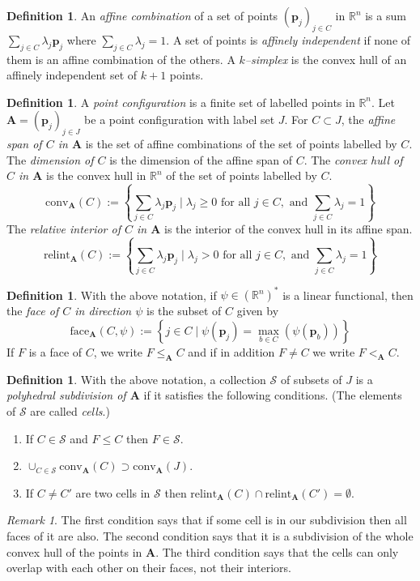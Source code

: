 \documentclass[12pt]{amsart}
\theoremstyle{definition}
\newtheorem{defn}[thm]{Definition}
\theoremstyle{remark}
\newtheorem{rmk}[thm]{Remark}
\def\R{\mathbb{R}}
\def \bA{\mathbf{A}} %
\def \bp{\mathbf{p}}
\begin{document}
\begin{defn}
An \emph{affine combination} of a set of points $(\bp_j)_{j\in C}$ in $\R^n$ is a sum $\sum_{j\in C} \lambda_j \bp_j$ where $ \sum_{j\in C} \lambda_j =1.$ A set of points is \emph{affinely independent} if none of them is an affine combination of the others. A \emph{$k$--simplex} is the convex hull of an affinely independent set of $k+1$ points.
\end{defn}
\begin{defn}
A \emph{point configuration} is a finite set of labelled points in $\R^n$. Let $\bA = (\bp_j)_{j\in J}$ be a point configuration with label set $J$. For $C\subset J$, the \emph{affine span of $C$ in $\bA$} is the set of affine combinations of the set of points labelled by $C$. The \emph{dimension of $C$} is the dimension of the affine span of $C$. The \emph{convex hull of $C$ in $\bA$} is the convex hull in $\R^n$ of the set of points labelled by $C$. 
\[ 
\text{conv}_\bA(C):=\left\{ \sum_{j\in C} \lambda_j \bp_j \mid \lambda_j\geq0 \text{ for all } j \in C, \text{ and } \sum_{j\in C} \lambda_j =1\right\}
\]
The \emph{relative interior of $C$ in $\bA$} is the interior of the convex hull in its affine span. 
\[ 
\text{relint}_\bA(C):=\left\{ \sum_{j\in C} \lambda_j \bp_j \mid \lambda_j >0 \text{ for all } j \in C, \text{ and } \sum_{j\in C} \lambda_j =1\right\}
\]
\end{defn}
\begin{defn}
With the above notation, if $\psi\in(\R^n)^*$ is a linear functional, then the \emph{face of $C$ in direction $\psi$} is the subset of $C$ given by
\[ 
\text{face}_\bA(C, \psi):=\left\{ j\in C \mid \psi(\bp_j)=\max_{b\in C}(\psi(\bp_b)) \right\}
\]
If $F$ is a face of $C$, we write $F\leq_\bA C$ and if in addition $F\neq C$ we write $F<_\bA C$.
\end{defn}
\begin{defn}
With the above notation, a collection $\mathcal{S}$ of subsets of $J$  is a \emph{polyhedral subdivision of $\bA$} if it satisfies the following conditions. (The elements of $\mathcal{S}$ are called \emph{cells}.)
\begin{enumerate}
\item If $C\in\mathcal{S}$ and $F\leq C$ then $F\in \mathcal{S}$. 
\item $\cup_{C\in\mathcal{S}} \text{conv}_\bA(C) \supset \text{conv}_\bA(J)$.
\item If $C\neq C'$ are two cells in $\mathcal{S}$ then $\text{relint}_\bA(C)\cap\text{relint}_\bA(C')=\emptyset$.
\end{enumerate}  
\end{defn}
\begin{rmk}
The first condition says that if some cell is in our subdivision then all faces of it are also. The second condition says that it is a subdivision of the whole convex hull of the points in $\bA$. The third condition says that the cells can only overlap with each other on their faces, not their interiors.
\end{rmk}
\end{document}
